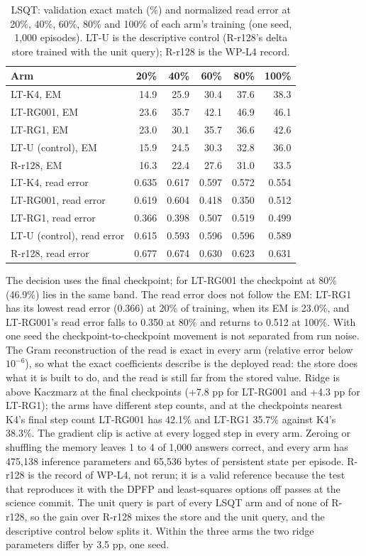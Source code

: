 \begin{table}[htbp]
\centering\footnotesize
\caption{LSQT: validation exact match (\%) and normalized read error at 20\%, 40\%, 60\%, 80\% and 100\% of each arm's training (one seed, 1,000 episodes). LT-U is the descriptive control (R-r128's delta store trained with the unit query); R-r128 is the WP-L4 record.  %
}
\label{tab:i-lsqt}
\begin{tabular}{@{}lrrrrr@{}}
\toprule
Arm & 20\% & 40\% & 60\% & 80\% & 100\% \\
\midrule
LT-K4, EM & 14.9 & 25.9 & 30.4 & 37.6 & 38.3 \\
LT-RG001, EM & 23.6 & 35.7 & 42.1 & 46.9 & 46.1 \\
LT-RG1, EM & 23.0 & 30.1 & 35.7 & 36.6 & 42.6 \\
LT-U (control), EM & 15.9 & 24.5 & 30.3 & 32.8 & 36.0 \\
R-r128, EM & 16.3 & 22.4 & 27.6 & 31.0 & 33.5 \\
\midrule
LT-K4, read error & 0.635 & 0.617 & 0.597 & 0.572 & 0.554 \\
LT-RG001, read error & 0.619 & 0.604 & 0.418 & 0.350 & 0.512 \\
LT-RG1, read error & 0.366 & 0.398 & 0.507 & 0.519 & 0.499 \\
LT-U (control), read error & 0.615 & 0.593 & 0.596 & 0.596 & 0.589 \\
R-r128, read error & 0.677 & 0.674 & 0.630 & 0.623 & 0.631 \\
\bottomrule
\end{tabular}
\end{table}

The decision uses the final checkpoint; for LT-RG001 the checkpoint at 80\% (46.9\%) lies in the same band.
The read error does not follow the EM: LT-RG1 has its lowest read error (0.366) at 20\% of training, when its EM is 23.0\%, and LT-RG001's read error falls to 0.350 at 80\% and returns to 0.512 at 100\%.
With one seed the checkpoint-to-checkpoint movement is not separated from run noise.  %
The Gram reconstruction of the read is exact in every arm (relative error below $10^{-6}$), so what the exact coefficients describe is the deployed read: the store does what it is built to do, and the read is still far from the stored value.  %
Ridge is above Kaczmarz at the final checkpoints (+7.8 pp for LT-RG001 and +4.3 pp for LT-RG1); the arms have different step counts, and at the checkpoints nearest K4's final step count LT-RG001 has 42.1\% and LT-RG1 35.7\% against K4's 38.3\%.  %
The gradient clip is active at every logged step in every arm.
Zeroing or shuffling the memory leaves 1 to 4 of 1,000 answers correct, and every arm has 475,138 inference parameters and 65,536 bytes of persistent state per episode.  %
R-r128 is the record of WP-L4, not rerun; it is a valid reference because the test that reproduces it with the DPFP and least-squares options off passes at the science commit.
The unit query is part of every LSQT arm and of none of R-r128, so the gain over R-r128 mixes the store and the unit query, and the descriptive control below splits it.
Within the three arms the two ridge parameters differ by 3.5 pp, one seed.  %

